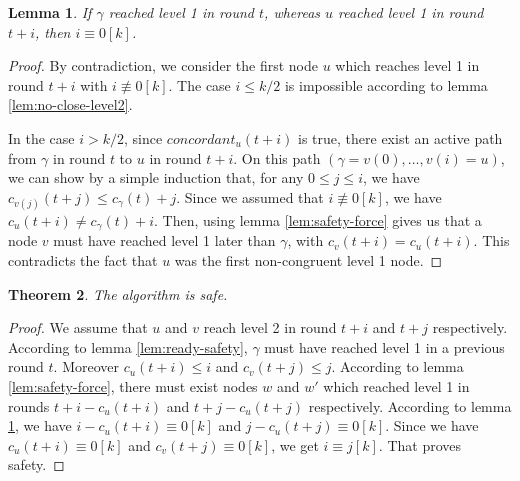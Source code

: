 \documentclass[11pt,letterpaper]{article}
\renewcommand{\leq}{\leqslant}
\newtheorem{thm}{Theorem}
\newtheorem{lem}[thm]{Lemma}
\newcommand{\cent}{\gamma}
\begin{document}
\begin{lem} \label{lem:later-level1}
	If $\cent$ reached level 1 in round $t$, whereas $u$ reached level 1 in round $t+i$, then $i \equiv 0 [k]$. 
\end{lem}
\begin{proof}
	By contradiction, we consider the first node $u$ which reaches level 1 in round $t+i$ with $i \not\equiv 0 [k]$.
	The case $i \leq k/2$ is impossible according to lemma \ref{lem:no-close-level2}.

	In the case $i > k/2$, since $concordant_u(t+i)$ is true, there exist an active path from $\cent$ in round $t$ to $u$ in round $t+i$.
	On this path $(\cent = v(0), \dots, v(i) = u)$, we can show by a simple induction that, for any $0 \leq j \leq i$, we have $c_{v(j)}(t+j) \leq c_\cent(t)+j$.
	Since we assumed that $i \not\equiv 0[k]$, we have $c_u(t+i) \neq c_\cent(t)+i$.
	Then, using lemma \ref{lem:safety-force} gives us that a node $v$ must have reached level 1 later than $\cent$, with $c_v(t+i) = c_u(t+i)$.
	This contradicts the fact that $u$ was the first non-congruent level 1 node.
\end{proof}

\begin{thm} \label{lem:safety} 
	The algorithm is safe.
\end{thm}
\begin{proof}
	We assume that $u$ and $v$ reach level 2 in round $t+i$ and $t+j$ respectively.
	According to lemma \ref{lem:ready-safety}, $\cent$ must have reached level 1 in a previous round $t$.
	Moreover $c_u(t+i) \leq i$ and $c_v(t+j) \leq j$.
	According to lemma \ref{lem:safety-force}, there must exist nodes $w$ and $w'$ which reached level 1 in rounds $t+i-c_u(t+i)$ and $t+j-c_u(t+j)$ respectively.
	According to lemma \ref{lem:later-level1}, we have $i-c_u(t+i) \equiv 0 [k]$ and $j-c_u(t+j) \equiv 0 [k]$. 
	Since we have $c_u(t+i) \equiv 0 [k]$ and $c_v(t+j) \equiv 0 [k]$, we get $i \equiv j [k]$. That proves safety.
\end{proof}
\end{document}
